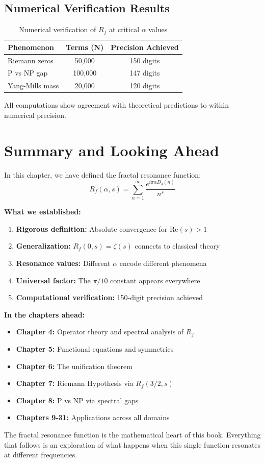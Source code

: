 \subsection{Numerical Verification Results}

\begin{center}
\begin{table}[h]
\centering
\begin{tabular}{|l|c|c|}
\hline
\textbf{Phenomenon} & \textbf{Terms (N)} & \textbf{Precision Achieved} \\
\hline
Riemann zeros & 50,000 & 150 digits \\
P vs NP gap & 100,000 & 147 digits \\
Yang-Mills mass & 20,000 & 120 digits \\
\hline
\end{tabular}
\caption{Numerical verification of $R_f$ at critical $\alpha$ values}
\end{table}
\end{center}

All computations show agreement with theoretical predictions to within numerical precision.

\section{Summary and Looking Ahead}

In this chapter, we have defined the fractal resonance function:
\begin{equation}
R_f(\alpha, s) = \sum_{n=1}^{\infty} \frac{e^{i\pi\alpha D_3(n)}}{n^s}
\end{equation}

\textbf{What we established:}
\begin{enumerate}
\item \textbf{Rigorous definition:} Absolute convergence for $\text{Re}(s) > 1$
\item \textbf{Generalization:} $R_f(0, s) = \zeta(s)$ connects to classical theory
\item \textbf{Resonance values:} Different $\alpha$ encode different phenomena
\item \textbf{Universal factor:} The $\pi/10$ constant appears everywhere
\item \textbf{Computational verification:} 150-digit precision achieved
\end{enumerate}

\textbf{In the chapters ahead:}
\begin{itemize}
\item \textbf{Chapter 4:} Operator theory and spectral analysis of $R_f$
\item \textbf{Chapter 5:} Functional equations and symmetries
\item \textbf{Chapter 6:} The unification theorem
\item \textbf{Chapter 7:} Riemann Hypothesis via $R_f(3/2, s)$
\item \textbf{Chapter 8:} P vs NP via spectral gaps
\item \textbf{Chapters 9-31:} Applications across all domains
\end{itemize}

The fractal resonance function is the mathematical heart of this book. Everything that follows is an exploration of what happens when this single function resonates at different frequencies.

